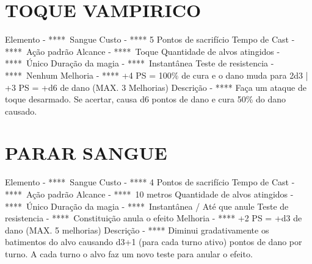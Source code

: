 \documentclass{article}%
\begin{document}
\section{TOQUE VAMPIRICO}%
\label{sec:TOQUEVAMPIRICO}%
Elemento {-} ****~Sangue\newline%
Custo {-} **** 5 Pontos de sacrifício\newline%
Tempo de Cast {-} ****~Ação padrão\newline%
Alcance {-} ****~Toque\newline%
Quantidade de alvos atingidos {-} ****~Único\newline%
Duração da magia {-} ****~Instantânea\newline%
Teste de resistencia {-} ****~Nenhum\newline%
Melhoria {-} **** +4 PS = 100\% de cura e o dano muda para 2d3 | +3 PS = +d6 de dano (MAX. 3 Melhorias)\newline%
Descrição {-} **** Faça um ataque de toque desarmado. Se acertar, causa d6 pontos de dano e cura 50\% do dano causado.\newline%

%
\section{PARAR SANGUE}%
\label{sec:PARARSANGUE}%
Elemento {-} ****~Sangue\newline%
Custo {-} **** 4 Pontos de sacrifício\newline%
Tempo de Cast {-} ****~Ação padrão\newline%
Alcance {-} ****~10 metros\newline%
Quantidade de alvos atingidos {-} ****~Único\newline%
Duração da magia {-} ****~Instantânea / Até que anule\newline%
Teste de resistencia {-} ****~Constituição anula o efeito\newline%
Melhoria {-} **** +2 PS = +d3 de dano (MAX. 5 melhorias)\newline%
Descrição {-} **** Diminui gradativamente os batimentos do alvo causando d3+1 (para cada turno ativo) pontos de dano por turno. A cada turno o alvo faz um novo teste para anular o efeito.\newline%

%
\end{document}
